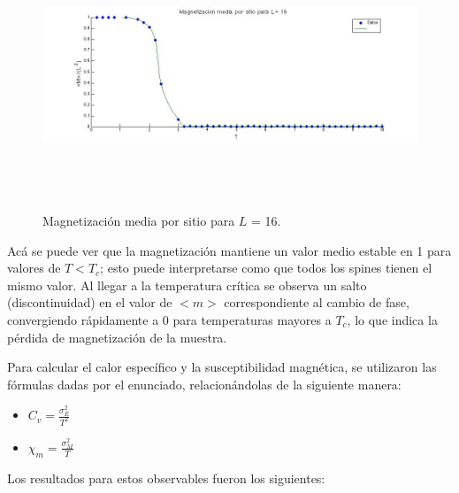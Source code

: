 \documentclass[a4paper,12pt]{article}
\begin{document}
\begin{figure}[H]
\begin{center}
\includegraphics[height=8cm,width=20cm]{../graficos/Mmean_L16.jpg}
\caption[width=5cm]{Magnetizaci\'on media por sitio para $L$ = 16.}
\end{center}
\end{figure}

Ac\'a se puede ver que la magnetizaci\'on mantiene un valor medio estable en 1 para valores de $T < T_{c}$; esto puede interpretarse como que todos los spines tienen el mismo valor. Al llegar a la temperatura cr\'itica se observa un salto (discontinuidad) en el valor de $<m>$ correspondiente al cambio de fase, convergiendo r\'apidamente a 0 para temperaturas mayores a $T_{c}$, lo que indica la p\'erdida de magnetizaci\'on de la muestra.


Para calcular el calor espec\'ifico y la susceptibilidad magn\'etica, se utilizaron las f\'ormulas dadas por el enunciado, relacion\'andolas de la siguiente manera:

\begin{itemize}
\item $C_{v} = \frac{\sigma_{E}^{2}}{T^2}$ 
\item $\chi_{m} = \frac{\sigma_{M}^{2}}{T}$ 
\end{itemize}

Los resultados para estos observables fueron los siguientes:
\end{document}
